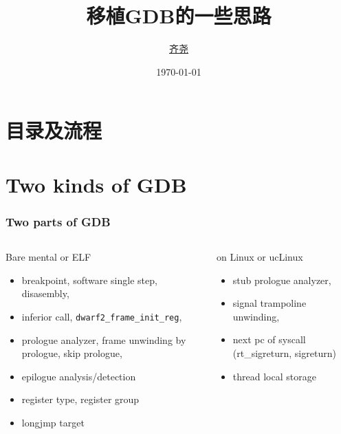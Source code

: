 \documentclass[cjk]{beamer}  %
\begin{document}
\begin{CJK}{UTF8}{gbsn}

\title{移植GDB的一些思路}
\author{\href{mailto:qiyaoltc@gmail.com}{齐尧}}
\date{\today}

\frame{\titlepage}


\section{目录及流程}
\frame{
    \tableofcontents
}

\section{Two kinds of GDB}

\begin{frame}
  \frametitle{Two parts of GDB}
  \begin{columns}
    \column{5cm}
    \begin{overprint}

      \begin{block}{Bare mental or ELF}
        \begin{itemize}
        \item breakpoint, software single step, disasembly,
        \item inferior call, \texttt{dwarf2\_frame\_init\_reg},
        \item prologue analyzer, frame unwinding by prologue, skip prologue,
        \item epilogue analysis/detection
        \item register type, register group
        \item longjmp target

        \end{itemize}
      \end{block}

    \end{overprint}


    \column{5cm}
    \begin{overprint}

      \begin{block}{on Linux or ucLinux}
        \begin{itemize}
        \item stub prologue analyzer,
        \item signal trampoline unwinding,
        \item next pc of syscall (rt\_sigreturn, sigreturn)
        \item thread local storage
        \end{itemize}
      \end{block}


\end{overprint}
\end{columns}
\end{frame}
\end{CJK}
\end{document}
